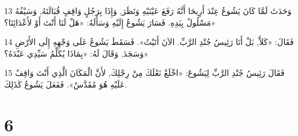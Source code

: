\par 13 وَحَدَثَ لَمَّا كَانَ يَشُوعُ عِنْدَ أَرِيحَا أَنَّهُ رَفَعَ عَيْنَيْهِ وَنَظَرَ, وَإِذَا بِرَجُلٍ وَاقِفٍ قُبَالَتَهُ, وَسَيْفُهُ مَسْلُولٌ بِيَدِهِ. فَسَارَ يَشُوعُ إِلَيْهِ وَسَأَلَهُ: «هَلْ لَنَا أَنْتَ أَوْ لأَعْدَائِنَا؟»
\par 14 فَقَالَ: «كَلاَّ, بَلْ أَنَا رَئِيسُ جُنْدِ الرَّبِّ. الآنَ أَتَيْتُ». فَسَقَطَ يَشُوعُ عَلَى وَجْهِهِ إِلَى الأَرْضِ وَسَجَدَ, وَقَالَ لَهُ: «بِمَاذَا يُكَلِّمُ سَيِّدِي عَبْدَهُ؟»
\par 15 فَقَالَ رَئِيسُ جُنْدِ الرَّبِّ لِيَشُوعَ: «اخْلَعْ نَعْلَكَ مِنْ رِجْلِكَ, لأَنَّ الْمَكَانَ الَّذِي أَنْتَ وَاقِفٌ عَلَيْهِ هُوَ مُقَدَّسٌ». فَفَعَلَ يَشُوعُ كَذَلِكَ.

\chapter{6}

